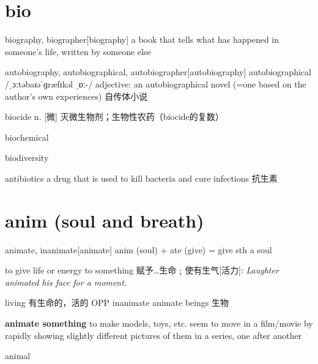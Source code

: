 \section{bio}

\begin{DefWord}{biography, biographer}[biography]
    a book that tells what has happened in someone’s life, written by someone else
\end{DefWord}

\begin{DefWord}{autobiography, autobiographical, autobiographer}[autobiography]
    autobiographical /ˌɔːtəbaɪəˈɡræfɪkəl ˌɒː-/ adjective:
    an autobiographical novel (=one based on the author’s own experiences) 自传体小说
\end{DefWord}

\begin{DefWord}{biocide}
    n. [微] 灭微生物剂；生物性农药（biocide的复数）
\end{DefWord}

\begin{DefWord}{biochemical}
\end{DefWord}

\begin{DefWord}{biodiversity}
\end{DefWord}

\begin{DefWord}{antibiotics}
    a drug that is used to kill bacteria and cure infections 抗生素
\end{DefWord}

\section{anim (soul and breath)}

\begin{DefWord}{animate, inanimate}[animate]
    anim (soul) + ate (give) = give sth a soul

    to give life or energy to something 赋予…生命﹔使有生气[活力]:
    \textit{Laughter animated his face for a moment.}

    living 有生命的，活的 OPP  inanimate
    animate beings 生物 

    \textbf{animate something} to make models, toys, etc. seem to move in a film/movie by rapidly showing slightly different pictures of them in a series, one after another
\end{DefWord}

\begin{DefWord}{animal}
\end{DefWord}

